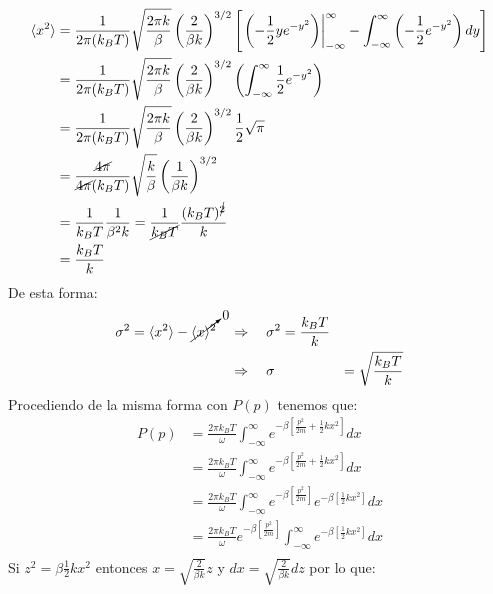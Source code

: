 \documentclass[a4paper]{article}
\begin{document}
\begin{answer}
        \begin{align*}
            \langle x^2 \rangle &=\frac{1}{2 \pi (k_B T)} \sqrt{\frac{2\pi k}{\beta}} \left(\frac{2}{\beta k}\right)^{3/2}  \left[
                \left.\left(-\frac{1}{2} y e^{-y^2} \right)\right|_{-\infty}^{\infty} - \int_{-\infty}^{\infty} \left(-\frac{1}{2} e^{-y^2} \right) dy
            \right]\\
            &=\frac{1}{2 \pi (k_B T)} \sqrt{\frac{2\pi k}{\beta}} \left(\frac{2}{\beta k}\right)^{3/2}  \left(\int_{-\infty}^{\infty}\frac{1}{2} e^{-y^2} \right) \\
            &=\frac{1}{2 \pi (k_B T)} \sqrt{\frac{2\pi k}{\beta}} \left(\frac{2}{\beta k}\right)^{3/2}  \frac{1}{2} \sqrt{\pi} \\
            &=\frac{\cancel{4\pi}}{\cancel{4\pi} (k_B T)} \sqrt{\frac{k}{\beta}} \left(\frac{1}{\beta k}\right)^{3/2}  \\
            &=\frac{1}{k_B T} \frac{1}{\beta^2 k} = \frac{1}{\cancel{k_B T}} \frac{(k_B T)^{\cancel 2}}{ k}\\
            &= \frac{k_B T}{k}\\
        \end{align*}
        De esta forma:
        \begin{align*}
            \sigma^2 =\langle x^2\rangle -\cancelto{0}{\langle x\rangle^2} \quad &\Rightarrow \quad \sigma^2 = \frac{k_B T}{k} \\
            &\Rightarrow \quad \sigma &= \sqrt{\frac{k_B T}{k}} \\
        \end{align*} 
        Procediendo de la misma forma con $P(p)$ tenemos que:
        \begin{align*}
            P(p) &= \frac{2 \pi k_B T}{\omega} \int_{-\infty}^{\infty} e^{-\beta\left[\frac{p^2}{2 m}+\frac{1}{2} k x^2\right]} d x \\
            &= \frac{2 \pi k_B T}{\omega} \int_{-\infty}^{\infty} e^{-\beta\left[\frac{p^2}{2 m}+\frac{1}{2} k x^2\right]} d x \\
            &= \frac{2 \pi k_B T}{\omega} \int_{-\infty}^{\infty} e^{-\beta\left[\frac{p^2}{2 m}\right]} e^{-\beta\left[\frac{1}{2} k x^2\right]} d x \\
            &= \frac{2 \pi k_B T}{\omega} e^{-\beta\left[\frac{p^2}{2 m}\right]} \int_{-\infty}^{\infty} e^{-\beta\left[\frac{1}{2} k x^2\right]} d x \\
        \end{align*}
        Si $z^2 = \beta \frac{1}{2} k x^2$ entonces $x = \sqrt{\frac{2}{\beta k}} z$ y $dx = \sqrt{\frac{2}{\beta k}} dz$ por lo que:

\end{answer}
\end{document}
